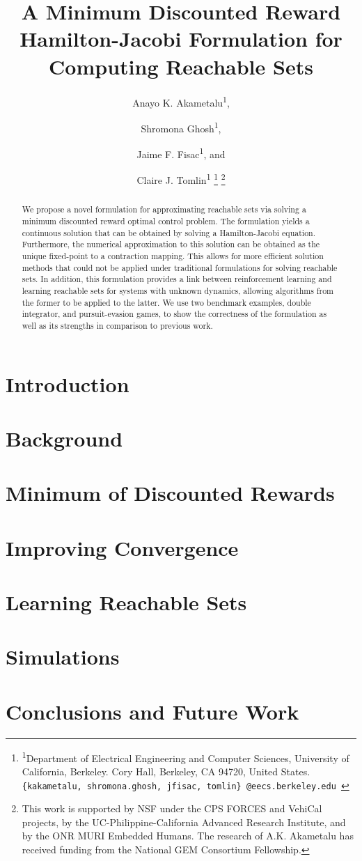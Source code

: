 \documentclass[journal,twoside,web]{ieeecolor}\onecolumnfalse
\title{\LARGE \bf
A Minimum Discounted Reward Hamilton-Jacobi Formulation for Computing Reachable Sets 
}
\author{
Anayo K. Akametalu\textsuperscript{1}, \and Shromona Ghosh\textsuperscript{1}, \and Jaime F. Fisac\textsuperscript{1}, and \and Claire J. Tomlin\textsuperscript{1}
\thanks{
\textsuperscript{1}Department of Electrical Engineering and Computer Sciences, 
        University of California, Berkeley. Cory Hall, Berkeley, CA 94720, United States.\newline
        {\tt\small \{kakametalu, shromona.ghosh, jfisac, tomlin\}~@eecs.berkeley.edu }}%
\thanks{
This work is supported by NSF under the CPS FORCES and VehiCal projects, by the UC-Philippine-California Advanced Research Institute, and by the ONR MURI Embedded Humans. The research of A.K. Akametalu has received funding from the National GEM Consortium Fellowship.} 
}
\begin{document}
\maketitle
\thispagestyle{empty}
\pagestyle{empty}

\begin{abstract}
We propose a novel formulation for approximating reachable sets via solving a minimum discounted reward optimal control problem. The formulation yields a continuous solution that can be obtained by solving a Hamilton-Jacobi equation. Furthermore, the numerical approximation to this solution can be obtained as the unique fixed-point to a contraction mapping. This allows for more efficient solution methods that could not be applied under traditional formulations for solving reachable sets. In addition, this formulation provides a link between reinforcement learning and learning reachable sets for systems with unknown dynamics, allowing algorithms from the former to be applied to the latter. We use two benchmark examples, double integrator, and pursuit-evasion games, to show the correctness of the formulation as well as its strengths in comparison to previous work.
\end{abstract}


\section{Introduction \label{sec:intro}}


\section{Background \label{sec:back}} 


\section{Minimum of Discounted Rewards \label{sec:mdr}}


\section{Improving Convergence \label{sec:conv}}


\section{Learning Reachable Sets \label{sec:learn}}


\section{Simulations \label{sec:sim}}


\section{Conclusions and Future Work \label{sec:end}}






\printbibliography
\end{document}
